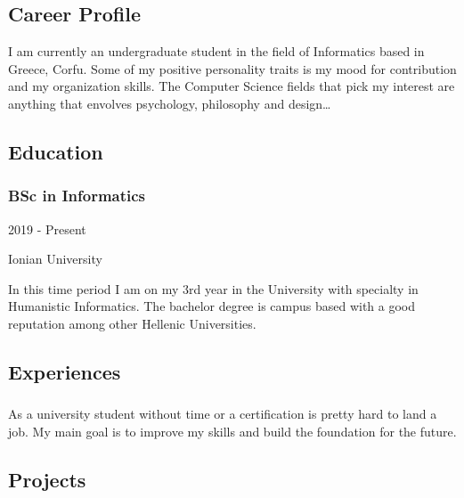 \documentclass[english,]{article}
\begin{document}
\hypertarget{career-profile}{%
\subsection{\texorpdfstring{{ \emph{} \emph{} } Career
Profile}{    Career Profile}}\label{career-profile}}

I am currently an undergraduate student in the field of Informatics
based in Greece, Corfu. Some of my positive personality traits is my
mood for contribution and my organization skills. The Computer Science
fields that pick my interest are anything that envolves psychology,
philosophy and design\ldots{}

\hypertarget{education}{%
\subsection{\texorpdfstring{{ \emph{} \emph{} }
Education}{    Education}}\label{education}}

\hypertarget{bsc-in-informatics}{%
\subsubsection{BSc in Informatics}\label{bsc-in-informatics}}

2019 - Present

Ionian University

In this time period I am on my 3rd year in the University with specialty
in Humanistic Informatics. The bachelor degree is campus based with a
good reputation among other Hellenic Universities.

\hypertarget{experiences}{%
\subsection{\texorpdfstring{{ \emph{} \emph{} }
Experiences}{    Experiences}}\label{experiences}}

\hypertarget{section}{%
\subsubsection{}\label{section}}

As a university student without time or a certification is pretty hard
to land a job. My main goal is to improve my skills and build the
foundation for the future.

\hypertarget{projects}{%
\subsection{\texorpdfstring{{ \emph{} \emph{} }
Projects}{    Projects}}\label{projects}}
\end{document}
